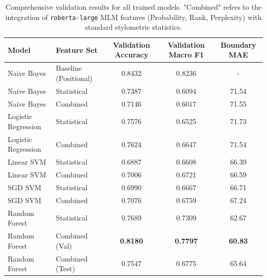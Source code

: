\documentclass[11pt]{article}
\begin{document}
\begin{table}[htbp]
    \centering
    \small
    \begin{tabular}{llccc}
        \hline
        \textbf{Model}      & \textbf{Feature Set}  & \textbf{Validation Accuracy} & \textbf{Validation Macro F1} & \textbf{Boundary MAE} \\
        \hline
        Naive Bayes         & Baseline (Positional) & 0.8432                       & 0.8236                       & -                     \\
        \hline
        Naive Bayes         & Statistical           & 0.7387                       & 0.6094                       & 71.54                 \\
        Naive Bayes         & Combined              & 0.7146                       & 0.6017                       & 71.55                 \\
        \hline
        Logistic Regression & Statistical           & 0.7576                       & 0.6525                       & 71.73                 \\
        Logistic Regression & Combined              & 0.7624                       & 0.6647                       & 71.54                 \\
        \hline
        Linear SVM          & Statistical           & 0.6887                       & 0.6608                       & 66.39                 \\
        Linear SVM          & Combined              & 0.7006                       & 0.6721                       & 66.59                 \\
        \hline
        SGD SVM             & Statistical           & 0.6990                       & 0.6667                       & 66.71                 \\
        SGD SVM             & Combined              & 0.7076                       & 0.6759                       & 67.24                 \\
        \hline
        Random Forest       & Statistical           & 0.7689                       & 0.7309                       & 62.67                 \\
        Random Forest       & Combined (Val)        & \textbf{0.8180}              & \textbf{0.7797}              & \textbf{60.83}        \\
        Random Forest       & Combined (Test)       & 0.7547                       & 0.6775                       & 65.64                 \\
        \hline
    \end{tabular}
    \caption{Comprehensive validation results for all trained models. "Combined" refers to the integration of \texttt{roberta-large} MLM features (Probability, Rank, Perplexity) with standard stylometric statistics.}
    \label{tab:full_results}
\end{table}
\end{document}
